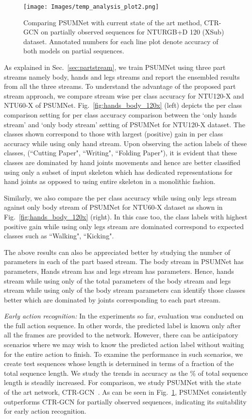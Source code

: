 \documentclass[runningheads]{llncs}
\begin{document}
\begin{figure}[!t]
  \centering
  \texttt{[image: Images/temp\_analysis\_plot2.png]}
  \caption{Comparing PSUMNet with current state of the art method, CTR-GCN on partially observed sequences for NTURGB+D 120 (XSub) dataset. Annotated numbers for each line plot denote accuracy of both models on partial sequences.} \label{fig:temp_analysis}
\end{figure}

As explained in Sec.~\ref{sec:partstream}, we train PSUMNet using three part streams namely body, hands and legs streams and report the ensembled results from all the three streams. To understand the advantage of the proposed part stream approach, we compare stream wise per class accuracy for NTU120-X and NTU60-X of PSUMNet. Fig.~\ref{fig:hands_body_120x} (left) depicts the per class comparison setting for per class accuracy comparison between the `only hands stream' and `only body stream' setting of PSUMNet for NTU120-X dataset. The classes shown correspond to those with largest (positive) gain in per class accuracy while using only hand stream. Upon observing the action labels of these classes, (``Cutting Paper", ``Writing", ``Folding Paper"), it is evident that these classes are dominated by hand joints movements and hence are better classified using only a subset of input skeleton which has dedicated representations for hand joints as opposed to using entire skeleton in a monolithic fashion. 

Similarly, we also compare the per class accuracy while using only legs stream against only body stream of PSUMNet for NTU60-X dataset as shown in Fig.~\ref{fig:hands_body_120x} (right). In this case too, the class labels with highest positive gain while using only legs stream are dominated correspond to expected classes such as ``Walking", ``Kicking". 

The above results can also be appreciated better by studying the number of parameters in each of the part based stream. The body stream in PSUMNet has  parameters, Hands stream has  and legs stream has  parameters. Hence, hands stream while using only  of the total parameters of the body stream and legs stream while using only  of the body stream parameters can identify those classes better which are dominated by joints corresponding to each part stream. 

\noindent \textit{Early action recognition:} In the experiments so far, evaluation was conducted on the full action sequence. In other words, the predicted label is known only after all the frames are provided to the network. However, there can be anticipatory scenarios where we may wish to know the predicted action label without waiting for the entire action to finish. To examine the performance in such scenarios, we create test sequences whose length is determined in terms of a fraction of the total sequence length. We study the trends in accuracy as the \% of total sequence length is steadily increased. For comparison, we study PSUMNet with the state of the art network, CTR-GCN~\cite{chen2021channel}. As can be seen in Fig.~\ref{fig:temp_analysis}, PSUMNet consistently outperforms CTR-GCN for partially observed sequences, indicating its suitability for early action recognition.
\end{document}
